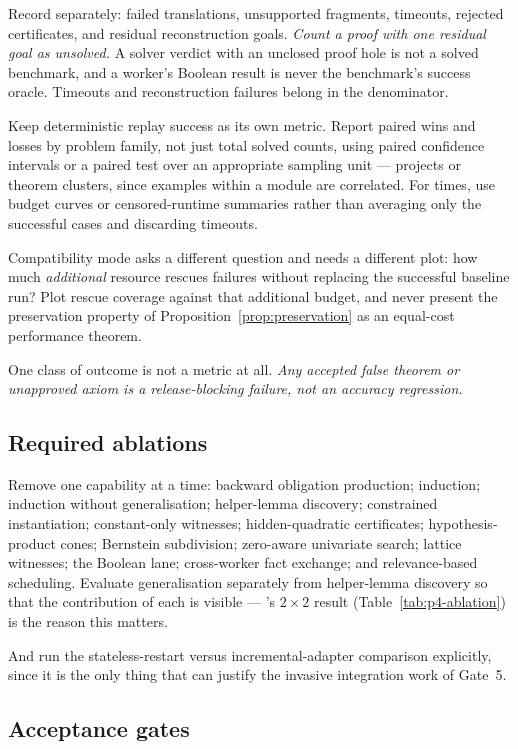 Record separately: failed translations, unsupported fragments, timeouts,
rejected certificates, and residual reconstruction goals. \emph{Count a proof
with one residual goal as unsolved.} A solver verdict with an unclosed proof
hole is not a solved benchmark, and a worker's Boolean result is never the
benchmark's success oracle. Timeouts and reconstruction failures belong in the
denominator.

Keep deterministic replay success as its own metric. Report paired wins and
losses by problem family, not just total solved counts, using paired confidence
intervals or a paired test over an appropriate sampling unit --- projects or
theorem clusters, since examples within a module are correlated. For times, use
budget curves or censored-runtime summaries rather than averaging only the
successful cases and discarding timeouts.

Compatibility mode asks a different question and needs a different plot: how
much \emph{additional} resource rescues failures without replacing the
successful baseline run? Plot rescue coverage against that additional budget,
and never present the preservation property of
Proposition~\ref{prop:preservation} as an equal-cost performance theorem.

One class of outcome is not a metric at all. \emph{Any accepted false theorem or
unapproved axiom is a release-blocking failure, not an accuracy regression.}

\subsection{Required ablations}

Remove one capability at a time: backward obligation production; induction;
induction without generalisation; helper-lemma discovery; constrained
instantiation; constant-only witnesses; hidden-quadratic certificates;
hypothesis-product cones; Bernstein subdivision; zero-aware univariate search;
lattice witnesses; the Boolean lane; cross-worker fact exchange; and
relevance-based scheduling. Evaluate generalisation separately from
helper-lemma discovery so that the contribution of each is visible --- 's
$2\times2$ result (Table~\ref{tab:p4-ablation}) is the reason this matters.

And run the stateless-restart versus incremental-adapter comparison explicitly,
since it is the only thing that can justify the invasive integration work of
Gate~5.

\subsection{Acceptance gates}

